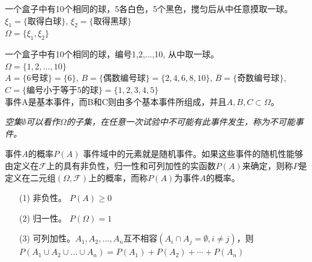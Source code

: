 \begin{frame}
\begin{example}
	一个盒子中有10个相同的球，5各白色，5个黑色，搅匀后从中任意摸取一球。\\
	$\xi_1=\{\text{取得白球} \}$, $\xi_2=\{\text{取得黑球} \}$\\
	$\Omega=\{\xi_1,\xi_2\}$
\end{example}
\begin{example}
	一个盒子中有10个相同的球，编号1,2,...,10, 从中取一球。\\
	$\Omega=\{1,2,\dots,10\}$\\
	$A=\{\text{6号球} \}=\{6\}$, $B=\{\text{偶数编号球} \}=\{2,4,6,8,10\}$, $\overline{B}=\{\text{奇数编号球}\}$,$C=\{\text{编号小于等于5的球} \}=\{1,2,3,4,5\}$\\
	事件A是基本事件，而B和C则由多个基本事件所组成，并且$A,B,C\subset\Omega$。
\end{example}
\textit{空集$\emptyset$可以看作$\Omega$的子集，在任意一次试验中不可能有此事件发生，称为不可能事件。}
\end{frame}

\begin{frame}{事件$A$的概率$P(A)$}
  事件域中的元素就是随机事件。如果这些事件的随机性能够由定义在$\mathcal{F}$上的具有非负性，归一性和可列加性的实函数$P(A)$来确定，则称$P$是定义在二元组$(\Omega,\mathcal{F})$上的概率，而称$P(A)$为事件$A$的概率。
  \begin{enumerate}
  	\item[(1)] 非负性。 $P(A)\ge 0$
  	\item[(2)] 归一性。 $P(\Omega)=1$
    \item[(3)] 可列加性。$A_1,A_2,...,A_n$互不相容$(A_i\cap A_j=\emptyset,i\ne j)$，则$P(A_1\cup A_2\cup\dots\cup A_n) = P(A_1)+P(A_2)+\cdots+P(A_n)$
  \end{enumerate}
\end{frame}

